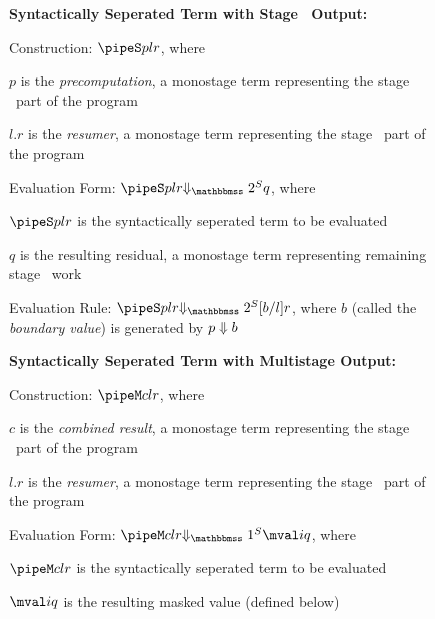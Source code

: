\begin{figure*}
\begin{abstrsyn}

\textbf{Syntactically Seperated Term with Stage \bbtwo\ Output:}

\hspace{2em} Construction: $\pipeS p l r$, where 
	
	\hspace{4em} $p$ is the {\em precomputation}, a monostage term representing the stage \bbone\ part of the program
	
	\hspace{4em} $l.r$ is the {\em resumer}, a monostage term representing the stage \bbtwo\ part of the program

\hspace{2em} Evaluation Form: $\sepredtwo {\pipeS p l r} q$, where 
	
	\hspace{4em} $\pipeS p l r$ is the syntactically seperated term to be evaluated 
	
	\hspace{4em} $q$ is the resulting residual, a monostage term representing remaining stage \bbtwo\ work

\hspace{2em} Evaluation Rule: $\sepredtwo {\pipeS p l r} {[b/l]r}$, where $b$ (called the {\em boundary value}) is generated by ${p} \Downarrow {b}$

\textbf{Syntactically Seperated Term with Multistage Output:}

\hspace{2em} Construction: $\pipeM c l r$, where 
	
	\hspace{4em} $c$ is the {\em combined result}, a monostage term representing the stage \bbone\ part of the program
	
	\hspace{4em} $l.r$ is the {\em resumer}, a monostage term representing the stage \bbtwo\ part of the program

\hspace{2em} Evaluation Form: $\sepredone {\pipeM c l r} {\mval i q}$, where 
	
	\hspace{4em} $\pipeM c l r$ is the syntactically seperated term to be evaluated
	
	\hspace{4em} $\mval i q$ is the resulting masked value (defined below)


\end{abstrsyn}
\end{figure*}
